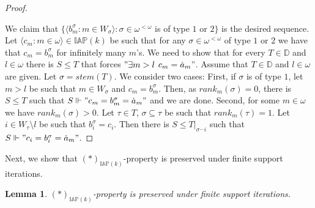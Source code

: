 \documentclass[a4paper]{amsart}
\newtheorem{lemma}[theorem]{Lemma}
\newcommand{\baire}{\omega^{<\omega}}
\newcommand{\IAP}{\mathbb{IAP}}
\begin{document}
\begin{proof}
\begin{itemize}
\end{itemize}
We claim that $\{\langle b^{\sigma}_{m}:m\in W_{\sigma}\rangle:\sigma\in\baire$ is of type $1$ or $2\}$ is the desired sequence. Let $\langle c_{m}:m\in\omega\rangle\in\IAP(k)$ be such that for any $\sigma\in\baire$ of type $1$ or $2$ we have that $c_{m}=b^{\sigma}_{m}$ for infinitely many $m$'s. We need to show that for every $T\in\mathbb{D}$ and $l\in\omega$ there is $S\leq T$ that forces $"\exists m>l$ $c_{m}=\dot{a}_{m}"$. Assume that $T\in\mathbb{D}$ and $l\in\omega$ are given. Let $\sigma=stem(T)$. We consider two cases: First, if $\sigma$ is of type $1$, let $m>l$ be such that $m\in W_{\sigma}$ and $c_{m}=b^{\sigma}_{m}$. Then, as $rank_{m}(\sigma)=0$, there is $S\leq T$ such that $S\Vdash"c_{m}=b^{\sigma}_{m}=\dot{a}_{m}"$ and we are done. Second, for some $m\in\omega$ we have $rank_{m}(\sigma)>0$. Let $\tau\in T$, $\sigma\subseteq\tau$ be such that $rank_{m}(\tau)=1$. Let $i\in W_{\tau}\setminus l$ be such that $b^{\sigma}_{i}=c_{i}$. Then there is $S\leq T|_{\sigma^{\frown}i}$ such that $S\Vdash"c_{i}=b^{\sigma}_{i}=\dot{a}_{m}"$.
\end{proof}
Next, we show that $(*)_{\IAP(k)}$-property is preserved under finite support iterations.
\begin{lemma}
    $(*)_{\IAP(k)}$-property is preserved under finite support iterations.
\end{lemma}
\end{document}
